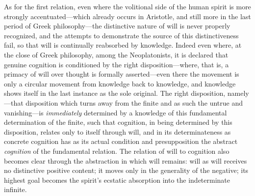 \documentclass[12pt,a4paper]{book}
\begin{document}
As for the first relation, even where the volitional side of the human
spirit is more strongly accentuated---which already occurs in Aristotle,
and still more in the last period of Greek philosophy---the distinctive
nature of will is never properly recognized, and the attempts to
demonstrate the source of this distinctiveness fail, so that will is
continually reabsorbed by knowledge. Indeed even where, at the close of
Greek philosophy, among the Neoplatonists, it is declared that genuine
cognition is conditioned by the right disposition---where, that is, a
primacy of will over thought is formally asserted---even there the
movement is only a circular movement from knowledge back to knowledge,
and knowledge shows itself in the last instance as the sole original.
The right disposition, namely---that disposition which turns away from
the finite and as such the untrue and vanishing---is \emph{immediately}
determined by a knowledge of this fundamental determination of the
finite, such that cognition, in being determined by this disposition,
relates only to itself through will, and in its determinateness as
concrete cognition has as its actual condition and presupposition the
abstract \emph{cognition} of the fundamental relation. The relation of will to
cognition also becomes clear through the abstraction in which will
remains: will as will receives no distinctive positive content; it moves
only in the generality of the negative; its highest goal becomes the
spirit's ecstatic absorption into the indeterminate infinite.
\end{document}
